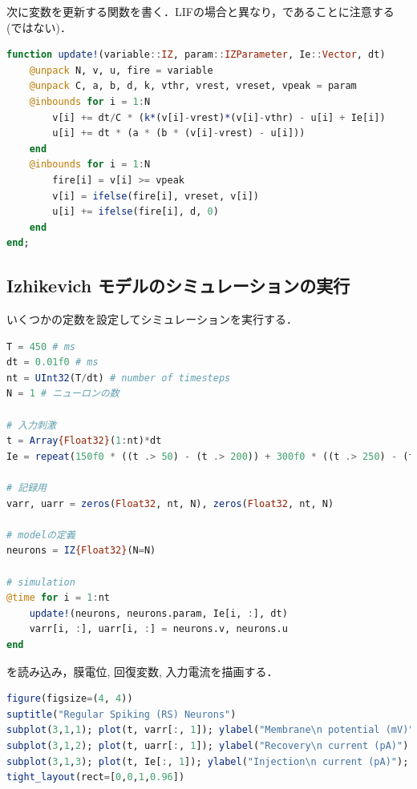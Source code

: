 次に変数を更新する関数を書く．LIFの場合と異なり，であることに注意する (ではない)．
\begin{lstlisting}[language=julia]
function update!(variable::IZ, param::IZParameter, Ie::Vector, dt)
    @unpack N, v, u, fire = variable
    @unpack C, a, b, d, k, vthr, vrest, vreset, vpeak = param
    @inbounds for i = 1:N
        v[i] += dt/C * (k*(v[i]-vrest)*(v[i]-vthr) - u[i] + Ie[i])
        u[i] += dt * (a * (b * (v[i]-vrest) - u[i]))
    end
    @inbounds for i = 1:N
        fire[i] = v[i] >= vpeak
        v[i] = ifelse(fire[i], vreset, v[i])
        u[i] += ifelse(fire[i], d, 0)
    end
end;
\end{lstlisting}
\subsection{Izhikevich モデルのシミュレーションの実行}
いくつかの定数を設定してシミュレーションを実行する．
\begin{lstlisting}[language=julia]
T = 450 # ms
dt = 0.01f0 # ms
nt = UInt32(T/dt) # number of timesteps
N = 1 # ニューロンの数

# 入力刺激
t = Array{Float32}(1:nt)*dt
Ie = repeat(150f0 * ((t .> 50) - (t .> 200)) + 300f0 * ((t .> 250) - (t .> 400)), 1, N)  # injection current

# 記録用
varr, uarr = zeros(Float32, nt, N), zeros(Float32, nt, N)

# modelの定義
neurons = IZ{Float32}(N=N)

# simulation
@time for i = 1:nt
    update!(neurons, neurons.param, Ie[i, :], dt)
    varr[i, :], uarr[i, :] = neurons.v, neurons.u
end
\end{lstlisting}
を読み込み，膜電位, 回復変数, 入力電流を描画する．
\begin{lstlisting}[language=julia]
figure(figsize=(4, 4))
suptitle("Regular Spiking (RS) Neurons")
subplot(3,1,1); plot(t, varr[:, 1]); ylabel("Membrane\n potential (mV)")
subplot(3,1,2); plot(t, uarr[:, 1]); ylabel("Recovery\n current (pA)")
subplot(3,1,3); plot(t, Ie[:, 1]); ylabel("Injection\n current (pA)"); xlabel("Times (ms)")
tight_layout(rect=[0,0,1,0.96])
\end{lstlisting}
